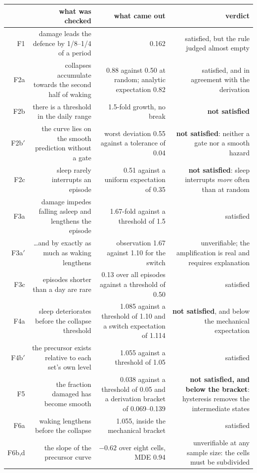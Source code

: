 \begin{table}[p]\small\centering
\begin{tabular}{@{}R{0.04}R{0.30}R{0.32}R{0.27}@{}}
\toprule
 & \textbf{what was checked} & \textbf{what came out} & \textbf{verdict}\\
\midrule
F1 & damage leads the defence by 1/8--1/4 of a period & 0.162 & satisfied, but the rule judged almost empty\\
F2a & collapses accumulate towards the second half of waking & 0.88 against 0.50 at random; analytic expectation 0.82 & satisfied, and in agreement with the derivation\\
F2b & there is a threshold in the daily range & 1.5-fold growth, no break & \textbf{not satisfied}\\
F2b$'$ & the curve lies on the smooth prediction without a gate & worst deviation 0.55 against a tolerance of 0.04 & \textbf{not satisfied}: neither a gate nor a smooth hazard\\
F2c & sleep rarely interrupts an episode & 0.51 against a uniform expectation of 0.35 & \textbf{not satisfied}: sleep interrupts \emph{more} often than at random\\
F3a & damage impedes falling asleep and lengthens the episode & 1.67-fold against a threshold of 1.5 & satisfied\\
F3a$'$ & \dots and by exactly as much as waking lengthens & observation 1.67 against 1.10 for the switch & unverifiable; the amplification is real and requires explanation\\
F3c & episodes shorter than a day are rare & 0.13 over all episodes against a threshold of 0.50 & satisfied\\
F4a & sleep deteriorates before the collapse threshold & 1.085 against a threshold of 1.10 and a switch expectation of 1.114 & \textbf{not satisfied}, and below the mechanical expectation\\
F4b$'$ & the precursor exists relative to each set's own level & 1.055 against a threshold of 1.05 & satisfied\\
F5 & the fraction damaged has become smooth & 0.038 against a threshold of 0.05 and a derivation bracket of 0.069--0.139 & \textbf{not satisfied, and below the bracket}: hysteresis removes the intermediate states\\
F6a & waking lengthens before the collapse & 1.055, inside the mechanical bracket & satisfied\\
F6b,d & the slope of the precursor curve & $-0.62$ over eight cells, MDE 0.94 & unverifiable at any sample size: the cells must be subdivided\\

\end{tabular}
\end{table}
